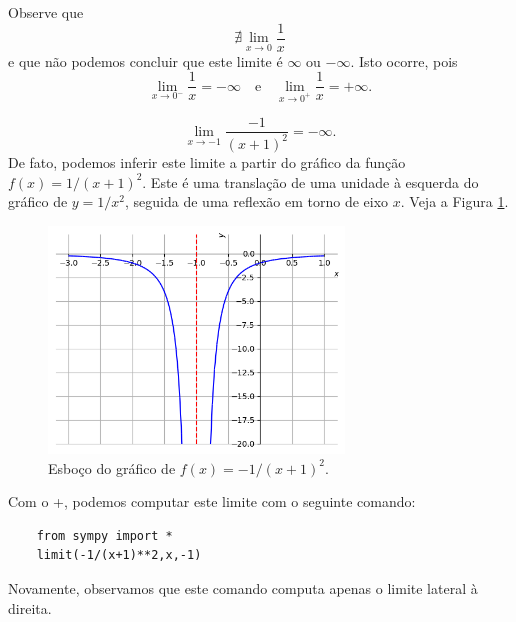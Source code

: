 \begin{ex}
  Observe que
  \begin{equation}
    \nexists \lim_{x\to 0} \frac{1}{x}
  \end{equation}
  e que não podemos concluir que este limite é $\infty$ ou $-\infty$. Isto ocorre, pois
  \begin{equation}
    \lim_{x\to 0^-} \frac{1}{x} = -\infty\quad\text{e}\quad\lim_{x\to 0^+} \frac{1}{x} = +\infty.
  \end{equation}
\end{ex}

\begin{ex}
  \begin{equation}
    \lim_{x\to -1} \frac{-1}{(x+1)^2} = -\infty.
  \end{equation}
  De fato, podemos inferir este limite a partir do gráfico da função $f(x) = 1/(x+1)^2$. Este é uma translação de uma unidade à esquerda do gráfico de $y = 1/x^2$, seguida de uma reflexão em torno de eixo $x$. Veja a Figura \ref{fig:ex_liminf-1x2}.

  \begin{figure}[H]
    \centering
    \includegraphics[width=0.7\textwidth]{./cap_lim/dados/fig_ex_liminf-1x2/fig_ex_liminf-1x2}
    \caption{Esboço do gráfico de $f(x)=-1/(x+1)^2$.}
    \label{fig:ex_liminf-1x2}
  \end{figure}

  \ifispython
  Com o {\python}+{\sympy}, podemos computar este limite com o seguinte comando:
  \begin{lstlisting}
    from sympy import *
    limit(-1/(x+1)**2,x,-1)
  \end{lstlisting}
  Novamente, observamos que este comando computa apenas o limite lateral à direita.
  \fi
\end{ex}

